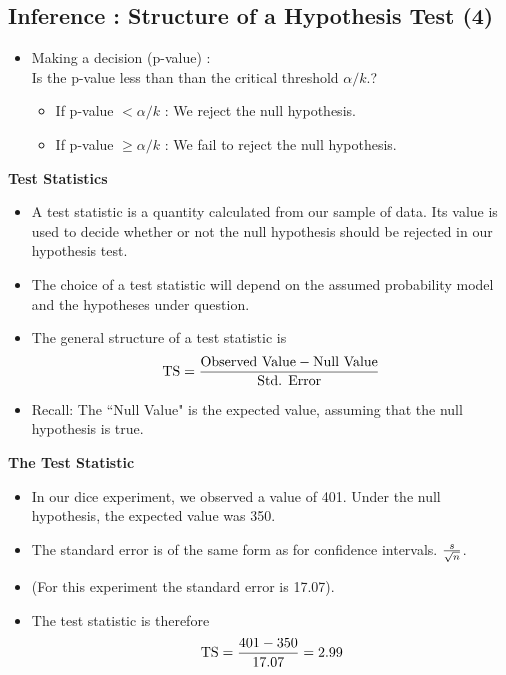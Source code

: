 \documentclass[]{report}
\begin{document}
{{{
\subsection{Inference : Structure of a Hypothesis Test (4) }
\begin{itemize}
\item Making a decision (p-value) : \\ Is the p-value less than than the critical threshold $\alpha / k$.?
\begin{itemize}
\item If p-value $< \alpha /k $ :  We reject the null hypothesis.
\item If p-value $\geq \alpha /k $ : We fail to reject the null hypothesis.
\end{itemize}
\end{itemize}


\newpage








\textbf{Test Statistics}
\begin{itemize}
\item A test statistic is a quantity calculated from our sample of data. Its value is used to decide whether or not the null hypothesis should be rejected in our hypothesis test.
\item The choice of a test statistic will depend on the assumed probability model and the hypotheses under question.
\item The general structure of a test statistic is
\[ \mbox{TS}  = {\mbox{Observed Value} - \mbox{Null Value}  \over \mbox{Std. Error}}\]
\item Recall: The ``Null Value" is the expected value, assuming that the null hypothesis is true.
\end{itemize}



\textbf{The Test Statistic}
\begin{itemize}

\item In our dice experiment, we observed a value of 401. Under the null hypothesis, the expected value was 350.
\item The standard error is of the same form as for confidence intervals. $s \over \sqrt{n}$.
\item (For this experiment the standard error is 17.07).
\item The test statistic is therefore \[ \mbox{TS}  = {401 - 350  \over 17.07} = 2.99 \]
\end{itemize}















}}}
\end{document}
